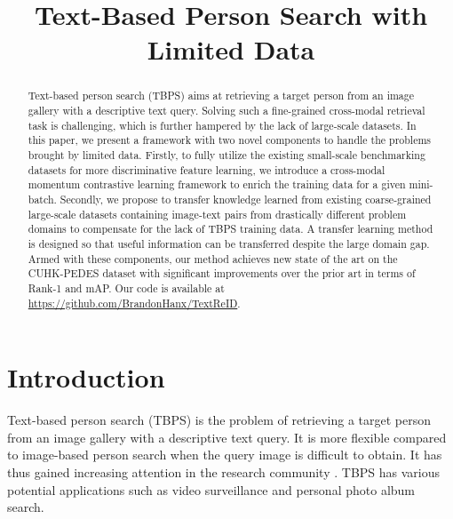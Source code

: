 \documentclass{bmvc2k}
\title{Text-Based Person Search with Limited Data}
\begin{document}
\maketitle

\begin{abstract}
Text-based person search (TBPS) aims at retrieving a target person from an image gallery with a descriptive text query.
Solving such a fine-grained cross-modal retrieval task is challenging, which is further hampered by the lack of large-scale datasets.
In this paper, we present a framework with two novel components to handle the problems brought by limited data. 
Firstly, to fully utilize the existing small-scale benchmarking datasets for more discriminative feature learning, we introduce a cross-modal momentum contrastive learning framework to enrich the training data for a given mini-batch. Secondly, we propose to transfer knowledge learned from existing coarse-grained large-scale datasets containing image-text pairs from drastically different problem domains to compensate for the lack of TBPS training data. A transfer learning method is designed so that useful information can be transferred despite the large domain gap.  Armed with these components, our method achieves new state of the art on the CUHK-PEDES dataset with significant improvements over the prior art in terms of Rank-1 and mAP.
Our code is available at \url{https://github.com/BrandonHanx/TextReID}.
\end{abstract}
 \vspace{2mm}
\section{Introduction}
Text-based person search (TBPS) \cite{li2017person} is the problem of  retrieving a target person from an image gallery with a descriptive text query. 
It is more flexible  compared to image-based person search when the query image is difficult to obtain. 
It has thus gained increasing attention in the research community \cite{ye2021survey,wang2020survey2,lin2021survey3}. 
TBPS has various potential applications such as video surveillance and personal photo album search.
\end{document}
